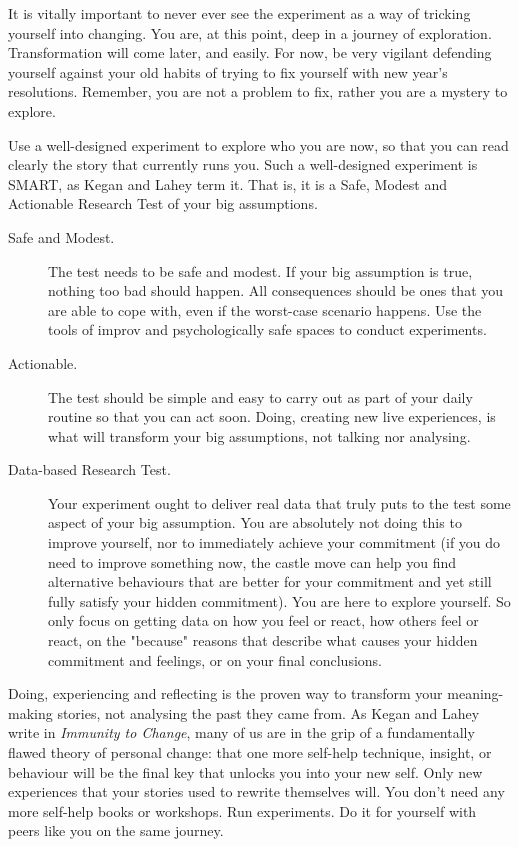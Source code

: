 It is vitally important to never ever see the experiment as a way of tricking yourself into changing. You are, at this point, deep in a journey of exploration. Transformation will come later, and easily. For now, be very vigilant defending yourself against your old habits of trying to fix yourself with new year's resolutions. Remember, you are not a problem to fix, rather you are a mystery to explore. 


Use a well-designed experiment to explore who you are now, so that you can read clearly the story that currently runs you. Such a well-designed experiment is SMART, as Kegan and Lahey term it. That is, it is a Safe, Modest and Actionable Research Test of your big assumptions.


\begin{description}
\item[Safe and Modest.] The test needs to be safe and modest. If your big assumption is true, nothing too bad should happen. All consequences should be ones that you are able to cope with, even if the worst-case scenario happens. Use the tools of improv and psychologically safe spaces to conduct experiments. 


\item[Actionable.] The test should be simple and easy to carry out as part of your daily routine so that you can act soon. Doing, creating new live experiences, is what will transform your big assumptions, not talking nor analysing. 


\item[Data-based Research Test.] Your experiment ought to deliver real data that truly puts to the test some aspect of your big assumption. You are absolutely not doing this to improve yourself, nor to immediately achieve your commitment (if you do need to improve something now, the castle move can help you find alternative behaviours that are better for your commitment and yet still fully satisfy your hidden commitment). You are here to explore yourself. So only focus on getting data on how you feel or react, how others feel or react, on the "because" reasons that describe what causes your hidden commitment and feelings, or on your final conclusions. 
\end{description}




Doing, experiencing and reflecting is the proven way to transform your meaning-making stories, not analysing the past they came from. As Kegan and Lahey write in \emph{Immunity to Change}\cite{kegan-immunity}, many of us are in the grip of a fundamentally flawed theory of personal change: that one more self-help technique, insight, or behaviour will be the final key that unlocks you into your new self. Only new experiences that your stories used to rewrite themselves\cite{wilson-redirect,salerno-sham} will. You don't need any more self-help books or workshops. Run experiments. Do it for yourself with peers like you on the same journey.


